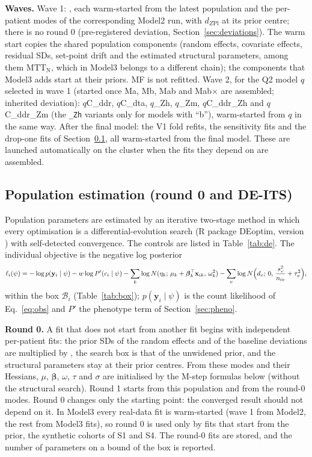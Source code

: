 \documentclass[11pt]{article}
\begin{document}
\textbf{Waves.} Wave 1: \valWaveOne, each warm-started from the latest population and the per-patient modes of the corresponding Model2 run, with $d_{Z\mathrm{Pl}}$ at its prior centre; there is no round 0 (pre-registered deviation, Section~\ref{sec:deviations}). The warm start copies the shared population components (random effects, covariate effects, residual SDs, set-point drift and the estimated structural parameters, among them $\mathrm{MTT}_{\mathrm{N}}$, which in Model3 belongs to a different chain); the components that Model3 adds start at their priors. MF is not refitted. Wave 2, for the Q2 model $q$ selected in wave 1 (started once Ma, Mb, Mab and Mab$\times$ are assembled; inherited deviation): $q$C\_ddr, $q$C\_dta, $q$\_Zh, $q$\_Zm, $q$C\_ddr\_Zh and $q$C\_ddr\_Zm (the \texttt{\_Zh} variants only for models with ``b''), warm-started from $q$ in the same way. After the final model: the V1 fold refits, the sensitivity fits and the drop-one fits of Section~\ref{sec:its}, all warm-started from the final model. These are launched automatically on the cluster when the fits they depend on are assembled.

\subsection{Population estimation (round 0 and DE-ITS)}\label{sec:its}
Population parameters are estimated by an iterative two-stage method \citep{steimer1984} in which every optimisation is a differential-evolution search (R package DEoptim, version \valDEoptim) with self-detected convergence. The controls are listed in Table~\ref{tab:de}. The individual objective is the negative log posterior
\begin{equation}
\ell_i(\psi) = -\log p(\mathbf y_i\mid\psi)-w\log P'(c_i\mid\psi)-\sum_k\log N(\eta_{k};\,\mu_k+\boldsymbol\beta_k^\top\mathbf x_{ik},\,\omega_k^2)-\sum_v\log N\Bigl(d_{v};\,0,\,\frac{s_v^2}{n_{iv}}+\tau_v^2\Bigr), \label{eq:nlp}
\end{equation}
within the box $\mathcal B_i$ (Table~\ref{tab:box}); $p(\mathbf y_i\mid\psi)$ is the count likelihood of Eq.~\ref{eq:obs} and $P'$ the phenotype term of Section~\ref{sec:pheno}.

\textbf{Round 0.} A fit that does not start from another fit begins with independent per-patient fits: the prior SDs of the random effects and of the baseline deviations are multiplied by \valRoundZeroMult, the search box is that of the unwidened prior, and the structural parameters stay at their prior centres. From these modes and their Hessians, $\mu$, $\boldsymbol\beta$, $\omega$, $\tau$ and $\sigma$ are initialised by the M-step formulas below (without the structural search). Round 1 starts from this population and from the round-0 modes. Round 0 changes only the starting point: the converged result should not depend on it. In Model3 every real-data fit is warm-started (wave 1 from Model2, the rest from Model3 fits), so round 0 is used only by fits that start from the prior, the synthetic cohorts of S1 and S4. The round-0 fits are stored, and the number of parameters on a bound of the box is reported.
\end{document}
